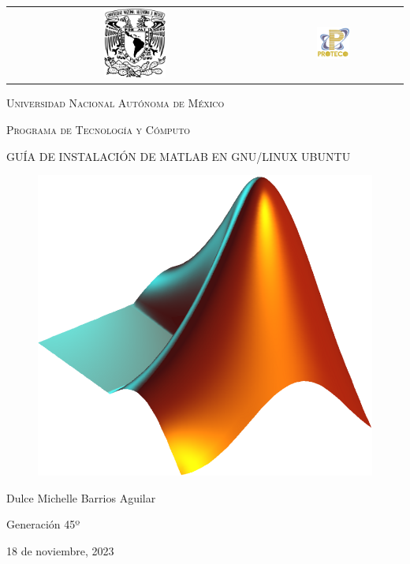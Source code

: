 \documentclass{article}
\begin{document}
\thispagestyle{empty}
\begin{titlepage}
\centering
\begin{center}
\begin{tabular}{c c}
\includegraphics[width=0.25\textwidth]{gg.png}\hspace{5cm}&\hspace{6cm}\includegraphics[width=0.25\textwidth]{download.png}\\
\end{tabular}
\end{center}

{\scshape\LARGE Universidad Nacional Autónoma de México \par}
\vspace{2cm}
{\scshape\Large Programa de Tecnología y Cómputo \par}
\vspace{2cm}
{\Large GUÍA DE INSTALACIÓN DE MATLAB EN GNU/LINUX UBUNTU\par}
\vfill
\begin{figure}[ht]
\centering
\includegraphics[width=.5\textwidth]{uno.png}
\end{figure}
{\Large Dulce Michelle Barrios Aguilar \par}

\vfill
{\Large Generación 45º\par}
\vfill
{\Large 18 de noviembre, 2023 \par}
\end{titlepage}
\newpage
\color{black}
\tableofcontents
\newpage 
\end{document}
